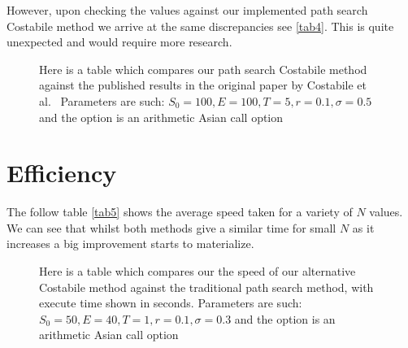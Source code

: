 However, upon checking the values against our implemented path search Costabile method we arrive at the same discrepancies see \autoref{tab4}. This is quite unexpected and would require more research.

\begin{figure}[H]
    \begin{center}
    \end{center}
    \caption{Here is a table which compares our path search Costabile method against the published results in the original paper by Costabile et al.~\cite{costabile2006adjusted} Parameters are such: \(S_0 = 100, E=100,T=5,r=0.1,\sigma=0.5\) and the option is an arithmetic Asian call option}\label{tab4}
\end{figure}

\section{Efficiency}

The follow table \autoref{tab5} shows the average speed taken for a variety of \(N \) values. We can see that whilst both methods give a similar time for small \(N\) as it increases a big improvement starts to materialize. 

\begin{figure}[H]
    \begin{center}
    \end{center}
    \caption{Here is a table which compares our the speed of our alternative Costabile method against the traditional path search method, with execute time shown in seconds. Parameters are such: \(S_0 = 50, E=40,T=1,r=0.1,\sigma=0.3\) and the option is an arithmetic Asian call option}\label{tab5}
\end{figure}